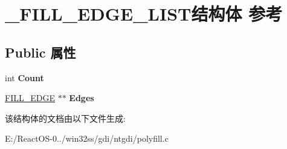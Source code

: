 \hypertarget{struct___f_i_l_l___e_d_g_e___l_i_s_t}{}\section{\+\_\+\+F\+I\+L\+L\+\_\+\+E\+D\+G\+E\+\_\+\+L\+I\+S\+T结构体 参考}
\label{struct___f_i_l_l___e_d_g_e___l_i_s_t}
\subsection*{Public 属性}
\begin{DoxyCompactItemize}
\item 
\mbox{\label{struct___f_i_l_l___e_d_g_e___l_i_s_t_a458094356543f0070dac0017155ef0a6}} 
int {\bfseries Count}
\item 
\mbox{\label{struct___f_i_l_l___e_d_g_e___l_i_s_t_a905023cf41aa621c062a2ee23ae47257}} 
\hyperlink{struct__tag_f_i_l_l___e_d_g_e}{F\+I\+L\+L\+\_\+\+E\+D\+GE} $\ast$$\ast$ {\bfseries Edges}
\end{DoxyCompactItemize}


该结构体的文档由以下文件生成\+:\begin{DoxyCompactItemize}
\item 
E\+:/\+React\+O\+S-\/0../win32ss/gdi/ntgdi/polyfill.\+c\end{DoxyCompactItemize}
